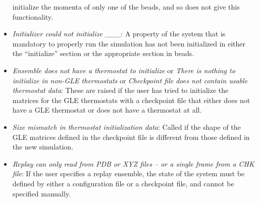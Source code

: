 \documentclass[11pt,english,fleqn]{report}
\begin{document}
\begin{itemize}
initialize the momenta of only one of the beads, and so \ipi does
not give this functionality.
\item \emph{Initializer could not initialize \_\_\_}: A property of the
system that is mandatory to properly run the simulation has not been
initialized in either the {}``initialize'' section or the appropriate
section in beads.
\item \emph{Ensemble does not have a thermostat to initialize} or \emph{There is nothing to initialize in non-GLE thermostats} or \emph{Checkpoint file does not contain usable thermostat data}:
These are raised if the user has tried to initialize the matrices
for the GLE thermostats with a checkpoint file that either does not
have a GLE thermostat or does not have a thermostat at all.
\item \emph{Size mismatch in thermostat initialization data}: Called if
the shape of the GLE matrices defined in the checkpoint file is different
from those defined in the new simulation. 
\item \emph{Replay can only read from PDB or XYZ files -- or a single frame from a CHK file}:
If the user specifies a replay ensemble, the state of the system must
be defined by either a configuration file or a checkpoint file, and
cannot be specified manually.
\end{itemize}
\end{document}
